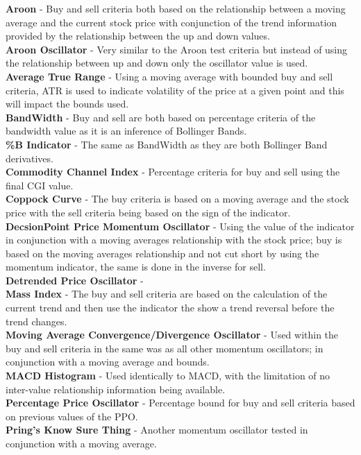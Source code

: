 \documentclass[12pt,a4paper]{article}
\begin{document}
\noindent
\textbf{Aroon} - Buy and sell criteria both based on the relationship between a moving average and the current stock price with conjunction of the trend information provided by the relationship between the up and down values.\\
\textbf{Aroon Oscillator} - Very similar to the Aroon test criteria but instead of using the relationship between up and down only the oscillator value is used.\\
\textbf{Average True Range} - Using a moving average with bounded buy and sell criteria, ATR is used to indicate volatility of the price at a given point and this will impact the bounds used.\\
\textbf{BandWidth} - Buy and sell are both based on percentage criteria of the bandwidth value as it is an inference of Bollinger Bands.\\
\textbf{\%B Indicator} - The same as BandWidth as they are both Bollinger Band derivatives. \\
\textbf{Commodity Channel Index} - Percentage criteria for buy and sell using the final CGI value.\\
\textbf{Coppock Curve} - The buy criteria is based on a moving average and the stock price with the sell criteria being based on the sign of the indicator.\\
\textbf{DecsionPoint Price Momentum Oscillator} - Using the value of the indicator in conjunction with a moving averages relationship with the stock price; buy is based on the moving averages relationship and not cut short by using the momentum indicator, the same is done in the inverse for sell.\\
\textbf{Detrended Price Oscillator} - \\
\textbf{Mass Index} - The buy and sell criteria are based on the calculation of the current trend and then use the indicator the show a trend reversal before the trend changes.\\
\textbf{Moving Average Convergence/Divergence Oscillator} - Used within the buy and sell criteria in the same was as all other momentum oscillators; in conjunction with a moving average and bounds.\\
\textbf{MACD Histogram} - Used identically to MACD, with the limitation of no inter-value relationship information being available. \\
\textbf{Percentage Price Oscillator} - Percentage bound for buy and sell criteria based on previous values of the PPO. \\
\textbf{Pring's Know Sure Thing} - Another momentum oscillator tested in conjunction with a moving average. \\
\end{document}
